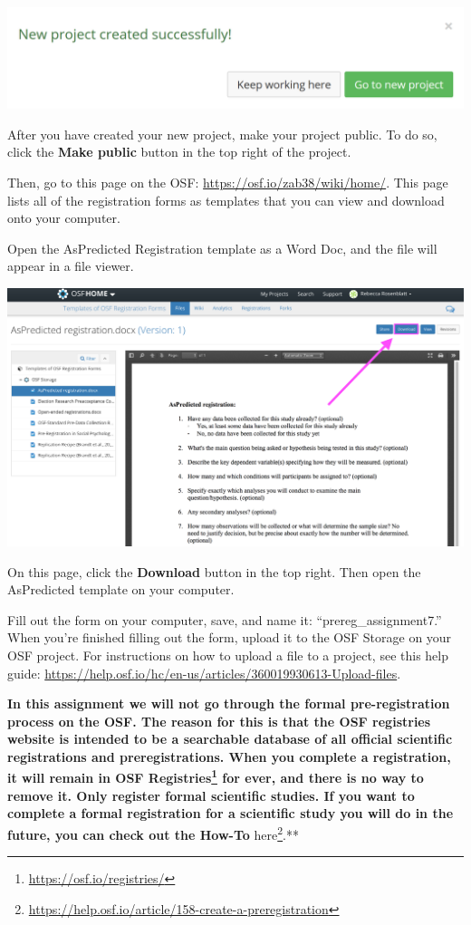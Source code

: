 \documentclass[
  oneside]{krantz}
\renewcommand{\href}[2]{#2\footnote{\url{#1}}}
\begin{document}
\begin{center}\includegraphics[width=1\linewidth]{images/34c3f0068911af6749513b1584c4cac7} \end{center}

After you have created your new project, make your project public. To do so,
click the \textbf{Make public} button in the top right of the project.

Then, go to this page on the OSF: \url{https://osf.io/zab38/wiki/home/}. This page
lists all of the registration forms as templates that you can view and download
onto your computer.

Open the AsPredicted Registration template as a Word Doc, and the file will
appear in a file viewer.

\begin{center}\includegraphics[width=1\linewidth]{images/895c7caf7508910ae52cc2d09e06f31c} \end{center}

On this page, click the \textbf{Download} button in the top right. Then open the
AsPredicted template on your computer.

Fill out the form on your computer, save, and name it: ``prereg\_assignment7.''
When you're finished filling out the form, upload it to the OSF Storage on your
OSF project. For instructions on how to upload a file to a project, see this
help guide: \url{https://help.osf.io/hc/en-us/articles/360019930613-Upload-files}.

\textbf{In this assignment we will not go through the formal pre-registration process on the OSF. The reason for this is that the OSF registries website is intended to be a searchable database of all official scientific registrations and preregistrations. When you complete a registration, it will remain in \href{https://osf.io/registries/}{OSF Registries} for ever, and there is no way to remove it. Only register formal scientific studies. If you want to complete a formal registration for a scientific study you will do in the future, you can check out the How-To} \href{https://help.osf.io/article/158-create-a-preregistration}{here}.**
\end{document}
